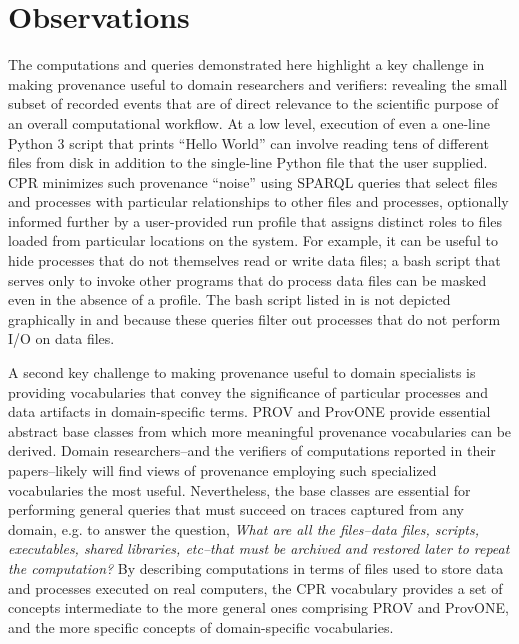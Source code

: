 \section{Observations}

The computations and queries demonstrated here highlight a key challenge in making provenance useful to domain researchers and verifiers: revealing the small subset of recorded events that are of direct relevance to the scientific purpose of an overall computational workflow. At a low level, execution of even a one-line Python 3 script that prints ``Hello World'' can involve reading tens of different files from disk in addition to the single-line Python file that the user supplied. CPR minimizes such provenance ``noise'' using SPARQL queries that select files and processes with particular relationships to other files and processes, optionally informed further by a user-provided run profile that assigns distinct roles to files loaded from particular locations on the system.  For example, it can be useful to hide processes that do not themselves read or write data files; a bash script that serves only to invoke other programs that do process data files can be masked even in the absence of a profile. The bash script listed in  is not depicted graphically in  and  because these queries filter out processes that do not perform I/O on data files.

A second key challenge to making provenance useful to domain specialists is providing vocabularies that convey the significance of particular processes and data artifacts in domain-specific terms. PROV and ProvONE provide essential abstract base classes from which more meaningful provenance vocabularies can be derived.  Domain researchers--and the verifiers of computations reported in their papers--likely will find views of provenance employing such specialized vocabularies the most useful. Nevertheless, the base classes are essential for performing general queries that must succeed on traces captured from any domain, e.g. to answer the question, \emph{What are all the files--data files, scripts, executables, shared libraries, etc--that must be archived and restored later to repeat the computation?} By describing computations in terms of files used to store data and processes executed on real computers, the CPR vocabulary provides a set of concepts intermediate to the more general ones comprising PROV and ProvONE, and the more specific concepts of domain-specific vocabularies. 

